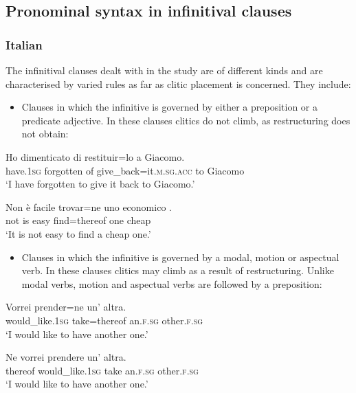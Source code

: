 \documentclass[output=paper,modfonts,nonflat,newtxmath]{langsci/langscibook}
\begin{document}
\subsection{{Pronominal} {syntax} {in} {infinitival} {clauses}} %
\label{sec:sciutti:2.2}

\subsubsection{Italian} %

The infinitival clauses dealt with in the study are of different kinds and are characterised by varied rules as far as clitic placement is concerned. They include:

\begin{itemize}
\item
Clauses in which the infinitive is governed by either a preposition or a predicate adjective. In these clauses clitics do not climb, as restructuring does not obtain:

\end{itemize}

\ea \label{ex:sciutti:3}
    \gll Ho dimenticato di restituir=lo a Giacomo.\\
        have.\textsc{1sg} forgotten of give\_back=it.\textsc{m.sg.acc} to Giacomo\\
    \glt  ‘I have forgotten to give it back to Giacomo.’
\z

\ea \label{ex:sciutti:4}
    \gll Non è facile trovar=ne uno economico .\\
         not is easy find=thereof one cheap\\
    \glt  ‘It is not easy to find a cheap one.’
\z


\begin{itemize}
\item
Clauses in which the infinitive is governed by a modal, motion or aspectual verb. In these clauses clitics may climb as a result of restructuring. Unlike modal verbs, motion and aspectual verbs are followed by a preposition:

\end{itemize}

\ea \label{ex:sciutti:5}
    \begin{xlist}
    \ex \label{ex:sciutti:5a}
    \gll Vorrei prender=ne un’ altra.\\
         would\_like.\textsc{1sg} take=thereof an.\textsc{f.sg} other.\textsc{f.sg}\\
    \glt  ‘I would like to have another one.’

    \ex \label{ex:sciutti:5b}
    \gll Ne vorrei prendere un’ altra.\\
         thereof would\_like.\textsc{1sg} take an.\textsc{f.sg} other.\textsc{f.sg}\\
    \glt  ‘I would like to have another one.’
    \end{xlist}
\z
\end{document}
